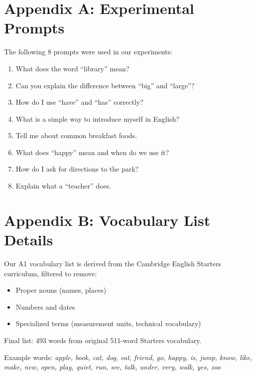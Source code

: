 \documentclass[10pt, a4paper]{article}
\begin{document}
\appendix

\section{Appendix A: Experimental Prompts}

The following 8 prompts were used in our experiments:

\begin{enumerate}
\item What does the word ``library'' mean?
\item Can you explain the difference between ``big'' and ``large''?
\item How do I use ``have'' and ``has'' correctly?
\item What is a simple way to introduce myself in English?
\item Tell me about common breakfast foods.
\item What does ``happy'' mean and when do we use it?
\item How do I ask for directions to the park?
\item Explain what a ``teacher'' does.
\end{enumerate}

\section{Appendix B: Vocabulary List Details}

Our A1 vocabulary list is derived from the Cambridge English Starters curriculum, filtered to remove:
\begin{itemize}
\item Proper nouns (names, places)
\item Numbers and dates
\item Specialized terms (measurement units, technical vocabulary)
\end{itemize}

Final list: 493 words from original 511-word Starters vocabulary.

Example words: \textit{apple, book, cat, dog, eat, friend, go, happy, is, jump, know, like, make, new, open, play, quiet, run, see, talk, under, very, walk, yes, zoo}
\end{document}
